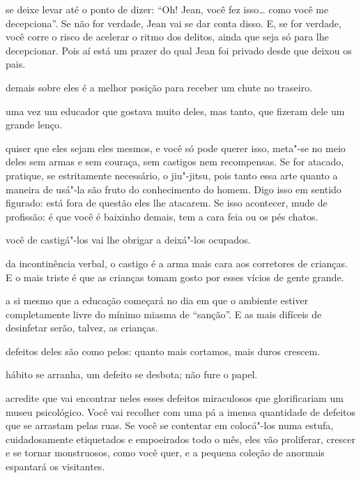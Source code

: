\pagebreak
\thispagestyle{empty}
\movetooddpage

 se deixe levar até o ponto de dizer: ``Oh! Jean, você fez isso\ldots{}
como você me decepciona''. Se não for verdade, Jean vai se dar conta
disso. E, se for verdade, você corre o risco de acelerar o ritmo dos
delitos, ainda que seja só para lhe decepcionar. Pois aí está um prazer
do qual Jean foi privado desde que deixou os pais.



 demais sobre eles é a melhor posição para receber um chute
no traseiro.



 uma vez um educador que gostava muito deles, mas tanto, que fizeram
dele um grande lenço.



 quiser que eles sejam eles mesmos, e você só pode querer isso,
meta"-se no meio deles sem armas e sem couraça, sem castigos nem
recompensas. Se for atacado, pratique, se estritamente necessário, o
jiu"-jitsu, pois tanto essa arte quanto a maneira de usá"-la são fruto do
conhecimento do homem. Digo isso em sentido figurado: está fora de
questão eles lhe atacarem. Se isso acontecer, mude de profissão: é que
você é baixinho demais, tem a cara feia ou os pés chatos.

\pagebreak

 você de castigá"-los vai lhe obrigar a deixá"-los ocupados.



 da incontinência verbal, o castigo é a arma mais cara aos
corretores de crianças. E o mais triste é que as crianças tomam gosto
por esses vícios de gente grande.



 a si mesmo que a educação começará no dia em que o ambiente estiver
completamente livre do mínimo miasma de ``sanção''. E as mais difíceis
de desinfetar serão, talvez, as crianças.



 defeitos deles são como pelos: quanto mais cortamos, mais duros
crescem.



 hábito se arranha, um defeito se desbota; não fure o papel.

\pagebreak

 acredite que vai encontrar neles esses defeitos miraculosos que
glorificariam um museu psicológico. Você vai recolher com uma pá a
imensa quantidade de defeitos que se arrastam pelas ruas. Se você se
contentar em colocá"-los numa estufa, cuidadosamente etiquetados e
empoeirados todo o mês, eles vão proliferar, crescer e se tornar
monstruosos, como você quer, e a pequena coleção de anormais espantará
os visitantes.




